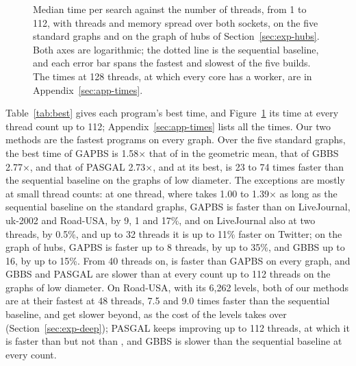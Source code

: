 \begin{figure}
    \vspace{0.5ex}
    \caption{Median time per search against the number of threads, from 1 to 112, with threads and memory spread over both sockets, on the five standard graphs and on the graph of hubs of Section~\ref{sec:exp-hubs}. Both axes are logarithmic; the dotted line is the sequential baseline, and each error bar spans the fastest and slowest of the five builds. The times at 128 threads, at which every core has a worker, are in Appendix~\ref{sec:app-times}.}
    \label{fig:scaling}
\end{figure}

Table~\ref{tab:best} gives each program's best time, and Figure~\ref{fig:scaling} its time at every thread count up to 112; Appendix~\ref{sec:app-times} lists all the times. Our two methods are the fastest programs on every graph. Over the five standard graphs, the best time of GAPBS is 1.58$\times$ that of \wfdo in the geometric mean, that of GBBS 2.77$\times$, and that of PASGAL 2.73$\times$, and at its best, \wfdo is 23 to 74 times faster than the sequential baseline on the graphs of low diameter. The exceptions are mostly at small thread counts: at one thread, where \wfdo takes 1.00 to 1.39$\times$ as long as the sequential baseline on the standard graphs, GAPBS is faster than \wfdo on LiveJournal, uk-2002 and Road-USA, by 9, 1 and 17\%, and on LiveJournal also at two threads, by 0.5\%, and up to 32 threads it is up to 11\% faster on Twitter; on the graph of hubs, GAPBS is faster up to 8 threads, by up to 35\%, and GBBS up to 16, by up to 15\%. From 40 threads on, \wfdo is faster than GAPBS on every graph, and GBBS and PASGAL are slower than \wfdo at every count up to 112 threads on the graphs of low diameter. On Road-USA, with its 6,262 levels, both of our methods are at their fastest at 48 threads, 7.5 and 9.0 times faster than the sequential baseline, and get slower beyond, as the cost of the levels takes over (Section~\ref{sec:exp-deep}); PASGAL keeps improving up to 112 threads, at which it is faster than \wfdo but not than \wfdomem, and GBBS is slower than the sequential baseline at every count.

